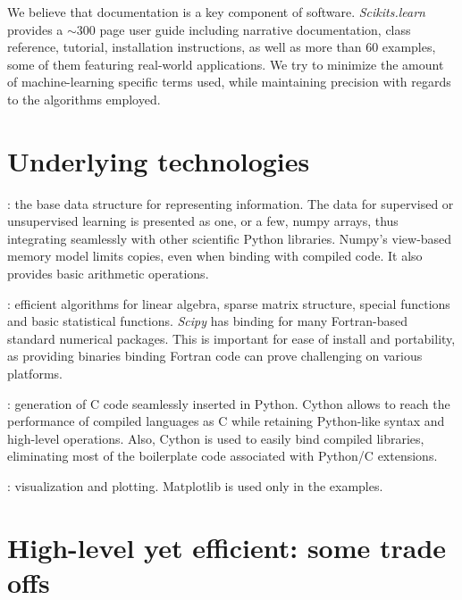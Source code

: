 \documentclass[twoside,11pt]{article}
\begin{document}
\smallskip {}
%
We believe that documentation is a key component of software.
\emph{Scikits.learn} provides a $\sim$300 page user guide including
narrative documentation, class reference, tutorial, installation
instructions, as well as more than 60 examples, some of them featuring
real-world applications. We try to minimize the amount of
machine-learning specific terms used, while maintaining precision with
regards to the algorithms employed.


\section{Underlying technologies}



\smallskip
{}:
%
the base data structure for representing
information. The data for supervised or unsupervised learning is
presented as one, or a few, numpy arrays, thus integrating seamlessly
with other scientific Python libraries. Numpy's view-based memory 
model limits copies, even when binding with compiled code. It also 
provides basic arithmetic operations. 

\smallskip
{}:
%
efficient algorithms for linear algebra, sparse matrix structure, special
functions and basic statistical functions. {\sl Scipy} has binding for
many Fortran-based standard numerical packages. This is important for
ease of install and portability, as providing binaries binding Fortran
code can prove challenging on various platforms. 

\smallskip
{}:
%
generation of C code seamlessly inserted in Python. Cython allows to
reach the performance of compiled languages as C while retaining
Python-like syntax and high-level operations. Also, Cython is used to
easily bind compiled libraries, eliminating most of the boilerplate code
associated with Python/C extensions.

\smallskip
{}:
%
visualization and plotting. Matplotlib is used only in the examples.

\section{High-level yet efficient: some trade offs}
\end{document}
